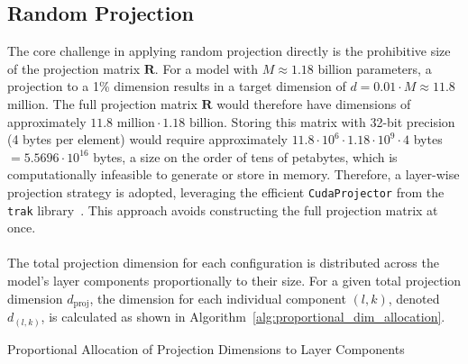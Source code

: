 \subsection{Random Projection}

The core challenge in applying random projection directly is the prohibitive size of the projection matrix $\mathbf{R}$. For a model with $M \approx 1.18$ billion parameters, a projection to a 1\% dimension results in a target dimension of $d = 0.01 \cdot M \approx 11.8$ million. The full projection matrix $\mathbf{R}$ would therefore have dimensions of approximately $11.8 \text{ million} \cdot 1.18 \text{ billion}$. Storing this matrix with 32-bit precision (4 bytes per element) would require approximately $11.8 \cdot 10^6 \cdot 1.18 \cdot 10^9 \cdot 4$ bytes $= 5.5696 \cdot 10^{16}$ bytes, a size on the order of tens of petabytes, which is computationally infeasible to generate or store in memory. Therefore, a layer-wise projection strategy is adopted, leveraging the efficient \texttt{CudaProjector} from the \texttt{trak} library~\cite{park2023trak}. This approach avoids constructing the full projection matrix at once.
\\\\
The total projection dimension for each configuration is distributed across the model's layer components proportionally to their size. For a given total projection dimension $d_\text{proj}$, the dimension for each individual component $(l,k)$, denoted $d_{(l,k)}$, is calculated as shown in Algorithm~\ref{alg:proportional_dim_allocation}.
\begin{algorithm}[ht]
\caption{Proportional Allocation of Projection Dimensions to Layer Components}
\label{alg:proportional_dim_allocation}
\DontPrintSemicolon

\end{algorithm}
